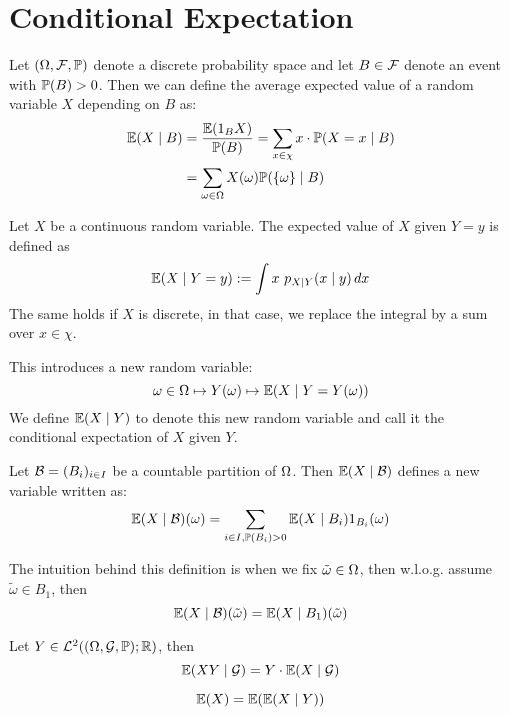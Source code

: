 \section{Conditional Expectation}
\begin{ddefinition*}
  Let \((\O, \F, \P)\) denote a discrete probability space and let \(B \in \F\) denote an event with \(\P(B) > 0\). Then we can define the average expected value of a random variable \(X\) depending on \(B\) as:
  \begin{align*}
    \E(X \mid B) &= \frac{\E(\I_B X)}{\P(B)} = \sum_{x \in \chi} x \cdot \P(X = x \mid B) \\
    &= \sum_{\omega \in \O} X(\omega) \P(\{\omega\} \mid B)
  \end{align*}
\end{ddefinition*}

\begin{cdefinition*}
  Let \(X\) be a continuous random variable. The expected value of \(X\) given \(Y = y\) is defined as
  \[\E(X \mid Y = y) := \int x \ p_{X \mid Y}(x \mid y) \,dx\]
  The same holds if \(X\) is discrete, in that case, we replace the integral by a sum over \(x \in \chi\).
\end{cdefinition*}

This introduces a new random variable:
\[\omega \in \O \mapsto Y(\omega) \mapsto \E(X \mid Y = Y(\omega))\]
We define \(\E(X \mid Y)\) to denote this new random variable and call it the conditional expectation of \(X\) given \(Y\).

\begin{ddefinition*}
  Let \(\B = (B_i)_{i \in I}\) be a countable partition of \(\O\). Then \(\E(X \mid \B)\) defines a new variable written as:
  \[\E(X \mid \B)(\omega) = \sum_{i \in I, \P(B_i) > 0} \E(X \mid B_i) \I_{B_i}(\omega)\]
\end{ddefinition*}

The intuition behind this definition is when we fix \(\tilde{\omega} \in \O\), then w.l.o.g. assume \(\tilde{\omega} \in B_1\), then
\[\E(X \mid \B)(\tilde{\omega}) = \E(X \mid B_1)(\tilde{\omega})\]

\begin{dtheorem*}
  Let \(Y \in \L^2((\O, \mathcal{G}, \P); \R)\), then
  \[\E(XY \mid \mathcal{G}) = Y \cdot \E(X \mid \mathcal{G})\]
\end{dtheorem*}

\begin{theorem*}
  \[\E(X) = \E(\E(X \mid Y))\]
\end{theorem*}
